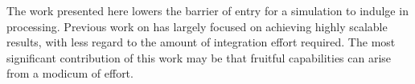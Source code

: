 The work presented here lowers the barrier of entry for a
simulation to indulge in \insitu{} processing.  Previous work on
\insitu{} has largely focused on achieving highly scalable results,
with less regard to the amount of integration effort required.  The
most significant contribution of this work may be that fruitful
capabilities can arise from a modicum of effort.

